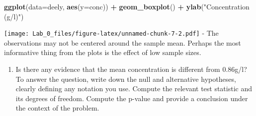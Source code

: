 \documentclass[]{article}
\newenvironment{Shaded}{\begin{snugshade}}{\end{snugshade}}
\newcommand{\KeywordTok}[1]{\textcolor[rgb]{0.13,0.29,0.53}{\textbf{#1}}}
\newcommand{\DataTypeTok}[1]{\textcolor[rgb]{0.13,0.29,0.53}{#1}}
\newcommand{\StringTok}[1]{\textcolor[rgb]{0.31,0.60,0.02}{#1}}
\newcommand{\OperatorTok}[1]{\textcolor[rgb]{0.81,0.36,0.00}{\textbf{#1}}}
\newcommand{\NormalTok}[1]{#1}
\providecommand{\tightlist}{%
  \setlength{\itemsep}{0pt}\setlength{\parskip}{0pt}}
\begin{document}
\begin{Shaded}
\begin{Highlighting}[]
\KeywordTok{ggplot}\NormalTok{(}\DataTypeTok{data=}\NormalTok{deely, }\KeywordTok{aes}\NormalTok{(}\DataTypeTok{y=}\NormalTok{conc)) }\OperatorTok{+}\StringTok{ }\KeywordTok{geom_boxplot}\NormalTok{() }\OperatorTok{+}\StringTok{ }\KeywordTok{ylab}\NormalTok{(}\StringTok{"Concentration (g/l)"}\NormalTok{)}
\end{Highlighting}
\end{Shaded}

\texttt{[image: Lab\_0\_files/figure-latex/unnamed-chunk-7-2.pdf]} - The
observations may not be centered around the sample mean. Perhaps the
most informative thing from the plots is the effect of low sample sizes.

\begin{enumerate}
\def\labelenumi{\alph{enumi})}
\setcounter{enumi}{2}
\tightlist
\item
  Is there any evidence that the mean concentration is different from
  0.86g/l? To answer the question, write down the null and alternative
  hypotheses, clearly defining any notation you use. Compute the
  relevant test statistic and its degrees of freedom. Compute the
  p-value and provide a conclusion under the context of the problem.
\end{enumerate}
\end{document}
